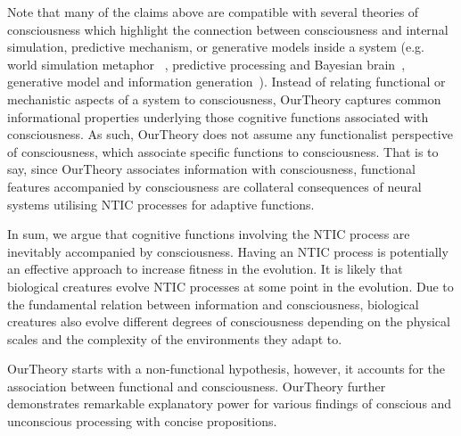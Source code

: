 \documentclass[utf8]{article}
\begin{document}
    	    Note that many of the claims above are compatible with several theories of consciousness which highlight the connection between consciousness and internal simulation, predictive mechanism, or generative models inside a system (e.g. world simulation metaphor ~\citep{revonsuo2006inner}, predictive processing and Bayesian brain~\citep{clark_2013,Hohwy2013,SethPP2014}, generative model and information generation~\citep{kanai_chang_yu_de_abril_biehl_guttenberg_2019}). Instead of relating functional or mechanistic aspects of a system to consciousness, \ac{OurTheory} captures common informational properties underlying those cognitive functions associated with consciousness. As such, \ac{OurTheory} does not assume any functionalist perspective of consciousness, which associate specific functions to consciousness.  That is to say, since \ac{OurTheory} associates information  with consciousness, functional features accompanied by consciousness are collateral consequences of neural systems utilising NTIC processes for adaptive functions. 
    	    
    	    In sum, we argue that cognitive functions involving the NTIC process are inevitably accompanied by consciousness. Having an NTIC process is potentially an effective approach to increase fitness in the evolution. It is likely that biological creatures evolve NTIC processes at some point in the evolution. Due to the fundamental relation between information and consciousness, biological creatures also evolve different degrees of consciousness depending on the physical scales and the complexity of the environments they adapt to. 
    	    
    	    \ac{OurTheory} starts with a non-functional hypothesis, however, it accounts for the association between  functional and consciousness. \ac{OurTheory} further demonstrates remarkable explanatory power for various findings of conscious and unconscious processing with concise propositions.
	    

        
\end{document}

